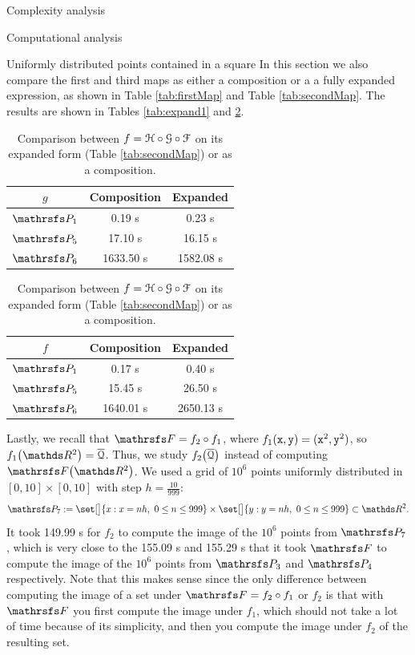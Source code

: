 \documentclass[11pt, a4paper, english, twoside, notitlepage, openright]{report}
\begin{document}
\begin{chapter}{Complexity analysis}
\begin{section}{Computational analysis}
\begin{subsection}{Uniformly distributed points contained in a square}
In this section we also compare the first and third maps as either a composition or a a fully expanded expression, as shown in Table \ref{tab:firstMap} and Table \ref{tab:secondMap}. The results are shown in Tables \ref{tab:expand1} and \ref{tab:expand2}.

\begin{table}[ht!]
\parbox{.45\linewidth}{
\centering
\begin{tabular}{c || c | c }
$g$ & Composition &Expanded \\ \hline \hline
$\PP_1$&0.19 s&0.23 s \\ \hline
$\PP_5$ & 17.10 s&16.15 s \\ \hline
$\PP_6$ &1633.50 s &1582.08 s \\
\end{tabular}
\caption[Comparison between $g$ on its expanded form or as a composition.]{Comparison between $g= \P\circ Q \circ H$ on its expanded form (Table \ref{tab:firstMap}) or as a composition.}\label{tab:expand1}
}
\hfill
\parbox{.45\linewidth}{
\centering
\begin{tabular}{c || c | c }
$f$ & Composition &Expanded \\ \hline \hline
$\PP_1$ & 0.17 s & 0.40 s \\ \hline
$\PP_5$ & 15.45 s & 26.50 s \\ \hline
$\PP_6$ & 1640.01 s & 2650.13 s \\
\end{tabular}
\caption[Comparison between $f$ on its expanded form or as a composition.]{Comparison between $f=\mathcal{H}\circ\mathcal{G}\circ\mathcal{F}$ on its expanded form (Table \ref{tab:secondMap}) or as a composition.}\label{tab:expand2}
}
\end{table}

Lastly, we recall that $\FFF=f_2\circ f_1$, where $f_1({\tt x},{\tt y})=({\tt x}^2,{\tt y}^2)$, so $f_1\big(\R^2\big) =\overline{\Qu}$. Thus, we study $f_2\big(\overline{\mathcal{Q}}\big)$ instead of computing $\FFF\big(\R^2\big)$. We used a grid of $10^6$ points uniformly distributed in $[0, 10]\times[0,10]$ with step $h=\tfrac{10}{999}$:
$$
\PP_7 := \set[\big]{x: x=nh,\ 0\le n\le 999 }\times\set[\big]{y: y=nh,\ 0\le n\le 999 }\subset \R^2.
$$
It took 149.99 s for $f_2$ to compute the image of the $10^6$ points from $\PP_7$, which is very close to the 155.09 s and 155.29 s that it took $\FFF$ to compute the image of the $10^6$ points from $\PP_3$ and $\PP_4$ respectively. Note that this makes sense since the only difference between computing the image of a set under $\FFF= f_2\circ f_1$ or $f_2$ is that with $\FFF$ you first compute the image under $f_1$, which should not take a lot of time because of its simplicity, and then you compute the image under $f_2$ of the resulting set.
\end{subsection}


\end{section}
\end{chapter}
\end{document}
